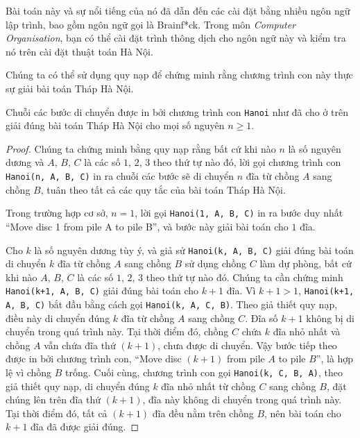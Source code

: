 \begin{infobox}
Bài toán này và sự nổi tiếng của nó đã dẫn đến các cài đặt bằng nhiều ngôn ngữ lập trình, bao gồm ngôn ngữ gọi là Brainf*ck. Trong môn \emph{Computer Organisation}, bạn có thể cài đặt trình thông dịch cho ngôn ngữ này và kiểm tra nó trên cài đặt thuật toán Hà Nội.
\end{infobox}

Chúng ta có thể sử dụng quy nạp để chứng minh rằng chương trình con này thực sự giải bài toán Tháp Hà Nội.

\begin{theorem}
Chuỗi các bước di chuyển được in bởi chương trình con \texttt{Hanoi} như đã cho ở trên giải đúng bài toán Tháp Hà Nội cho mọi số nguyên $n \geq 1$.
\end{theorem}

\begin{proof}
Chúng ta chứng minh bằng quy nạp rằng bất cứ khi nào $n$ là số nguyên dương và $A$, $B$, $C$ là các số $1$, $2$, $3$ theo thứ tự nào đó, lời gọi chương trình con \texttt{Hanoi(n, A, B, C)} in ra chuỗi các bước sẽ di chuyển $n$ đĩa từ chồng $A$ sang chồng $B$, tuân theo tất cả các quy tắc của bài toán Tháp Hà Nội.

Trong trường hợp cơ sở, $n = 1$, lời gọi \texttt{Hanoi(1, A, B, C)} in ra bước duy nhất ``Move disc 1 from pile A to pile B'', và bước này giải bài toán cho $1$ đĩa.

Cho $k$ là số nguyên dương tùy ý, và giả sử \texttt{Hanoi(k, A, B, C)} giải đúng bài toán di chuyển $k$ đĩa từ chồng $A$ sang chồng $B$ sử dụng chồng $C$ làm dự phòng, bất cứ khi nào $A$, $B$, $C$ là các số $1$, $2$, $3$ theo thứ tự nào đó. Chúng ta cần chứng minh \texttt{Hanoi(k+1, A, B, C)} giải đúng bài toán cho $k + 1$ đĩa. Vì $k + 1 > 1$, \texttt{Hanoi(k+1, A, B, C)} bắt đầu bằng cách gọi \texttt{Hanoi(k, A, C, B)}. Theo giả thiết quy nạp, điều này di chuyển đúng $k$ đĩa từ chồng $A$ sang chồng $C$. Đĩa số $k + 1$ không bị di chuyển trong quá trình này. Tại thời điểm đó, chồng $C$ chứa $k$ đĩa nhỏ nhất và chồng $A$ vẫn chứa đĩa thứ $(k+1)$, chưa được di chuyển. Vậy bước tiếp theo được in bởi chương trình con, ``Move disc $(k+1)$ from pile $A$ to pile $B$'', là hợp lệ vì chồng $B$ trống. Cuối cùng, chương trình con gọi \texttt{Hanoi(k, C, B, A)}, theo giả thiết quy nạp, di chuyển đúng $k$ đĩa nhỏ nhất từ chồng $C$ sang chồng $B$, đặt chúng lên trên đĩa thứ $(k+1)$, đĩa này không di chuyển trong quá trình này. Tại thời điểm đó, tất cả $(k+1)$ đĩa đều nằm trên chồng $B$, nên bài toán cho $k + 1$ đĩa đã được giải đúng.
\end{proof}

